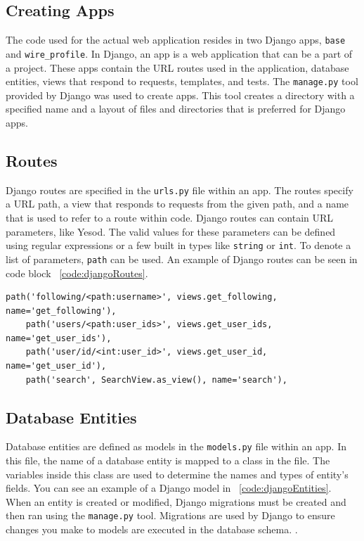 \subsection{Creating Apps}

The code used for the actual web application resides in two Django apps, \texttt{base} and
\texttt{wire\_profile}. In Django, an app is a web application that can be a part of a project.
These apps contain the URL routes used in the application, database entities, views
that respond to requests, templates, and tests. The \texttt{manage.py} tool provided
by Django was used to create apps. This tool creates a directory with a specified name
and a layout of files and directories that is preferred for Django apps. \parencite{djangoIntroDocs}

\subsection{Routes}

Django routes are specified in the \texttt{urls.py} file within an app. The routes
specify a URL path, a view that responds to requests from the given path, and a name
that is used to refer to a route within code. Django routes can contain URL parameters,
like Yesod. The valid values for these parameters can be defined using regular expressions
or a few built in types like \texttt{string} or \texttt{int}. To denote a list of parameters,
\texttt{path} can be used. An example of Django routes can be seen in code block ~\ref{code:djangoRoutes}.


\begin{lstlisting}[caption={An extract of Django routes},label={code:djangoRoutes}]
    path('following/<path:username>', views.get_following, name='get_following'),
    path('users/<path:user_ids>', views.get_user_ids, name='get_user_ids'),
    path('user/id/<int:user_id>', views.get_user_id, name='get_user_id'),
    path('search', SearchView.as_view(), name='search'),
\end{lstlisting}

\subsection{Database Entities}

Database entities are defined as models in the \texttt{models.py} file within an app.
In this file, the name of a database entity is mapped to a class in the file. The variables inside
this class are used to determine the names and types of entity's fields. You can see
an example of a Django model in ~\ref{code:djangoEntities}. When an entity is created 
or modified, Django migrations must be created and then ran using the \texttt{manage.py} tool. 
Migrations are used by Django to ensure changes you make to models are executed in 
the database schema. \parencite{djangoMigrations}.

